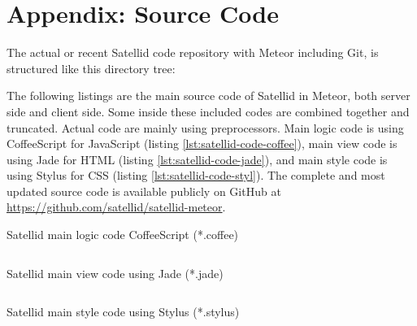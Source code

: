 \chapter{Appendix: Source Code}
\label{apx:source-code}

The actual or recent Satellid code repository with Meteor including Git, is structured like this directory tree:


\noindent The following listings are the main source code of Satellid in Meteor, both server side and client side.
Some inside these included codes are combined together and truncated.
Actual code are mainly using preprocessors.
Main logic code is using CoffeeScript for JavaScript (listing \autoref{lst:satellid-code-coffee}), main view code is using Jade for HTML (listing \autoref{lst:satellid-code-jade}), and main style code is using Stylus for CSS (listing \autoref{lst:satellid-code-styl}).
The complete and most updated source code is available publicly on GitHub at \url{https://github.com/satellid/satellid-meteor}.

\begin{listing}[tbp]
  \caption[Satellid main logic code]{Satellid main logic code CoffeeScript (*.coffee)}
  \inputminted{coffeescript}{\dir/code/.snippets/satellid.coffee}
  \label{lst:satellid-code-coffee}
\end{listing}

\begin{listing}[tbp]
  \caption[Satellid main view code]{Satellid main view code using Jade (*.jade)}
  \inputminted{jade}{\dir/code/.snippets/satellid.jade}
  \label{lst:satellid-code-jade}
\end{listing}

\begin{listing}[tbp]
  \caption[Satellid main style code]{Satellid main style code using Stylus (*.stylus)}
  \inputminted{css}{\dir/code/.snippets/satellid.styl}
  \label{lst:satellid-code-styl}
\end{listing}
